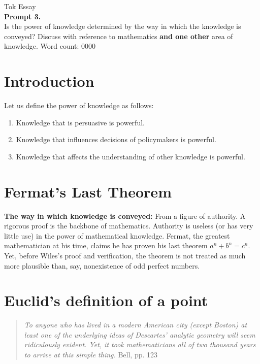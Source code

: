 \documentclass[a4paper, 12pt]{article}
\begin{document}
\begin{titlepage}
  \begin{center}
    Tok Essay\\
    \vspace*{5cm}    
    {\large \textbf{Prompt 3.}\\
    Is the power of knowledge determined by the way in which the knowledge is conveyed?
    Discuss with reference to mathematics \textbf{and one other} area of knowledge.}
    \vfill
    Word count: 0000
  \end{center}
\end{titlepage}

\section*{Introduction}
Let us define the power of knowledge as follows: %
\begin{enumerate}
  \item Knowledge that is persuasive is powerful.
  \item Knowledge that influences decisions of policymakers is powerful.
  \item Knowledge that affects the understanding of other knowledge is powerful.
\end{enumerate}

\section{Fermat's Last Theorem}
\textbf{The way in which knowledge is conveyed:} From a figure of authority.
A rigorous proof is the backbone of mathematics.
Authority is useless (or has very little use) in the power of mathematical knowledge.
Fermat, the greatest mathematician at his time, claims he has proven his last theorem $a^n + b^n = c^n$.
Yet, before Wiles's proof and verification, the theorem is not treated as much more plausible than, say, nonexistence of odd perfect numbers.

\section{Euclid's definition of a point}
\begin{quote}
  \textit{To anyone who has lived in a modern American city
  (except Boston) at least one of the underlying ideas of
  Descartes' analytic geometry will seem ridiculously evident.
  Yet, it took mathematicians all of two thousand
  years to arrive at this simple thing.}
  \hfill
  Bell, pp. 123
\end{quote}
\end{document}
